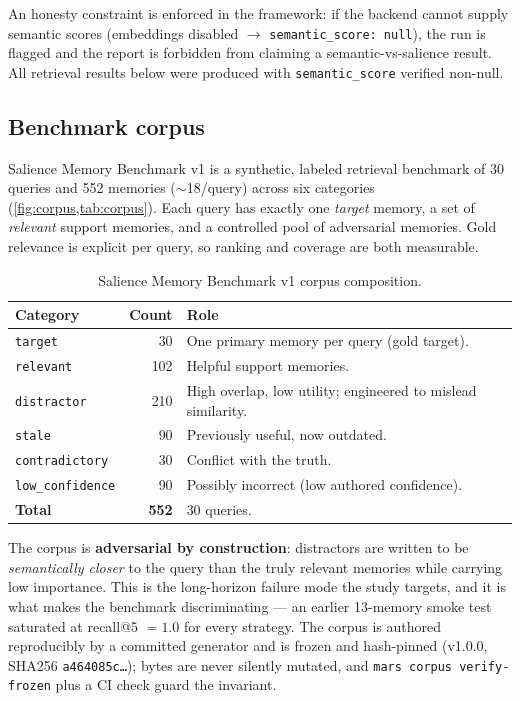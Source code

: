 \documentclass[11pt]{article}
\begin{document}
An honesty constraint is enforced in the framework: if the backend cannot supply semantic
scores (embeddings disabled $\to$ \texttt{semantic\_score: null}), the run is flagged and
the report is forbidden from claiming a semantic-vs-salience result. All retrieval results
below were produced with \texttt{semantic\_score} verified non-null.

\subsection{Benchmark corpus}
Salience Memory Benchmark v1 is a synthetic, labeled retrieval benchmark of 30 queries and
552 memories ($\sim$18/query) across six categories (\cref{fig:corpus,tab:corpus}). Each
query has exactly one \emph{target} memory, a set of \emph{relevant} support memories, and
a controlled pool of adversarial memories. Gold relevance is explicit per query, so ranking
and coverage are both measurable.

\begin{table}[h]
\centering
\caption{Salience Memory Benchmark v1 corpus composition.}
\label{tab:corpus}
\begin{tabular}{lrl}
\toprule
Category & Count & Role \\
\midrule
\texttt{target} & 30 & One primary memory per query (gold target). \\
\texttt{relevant} & 102 & Helpful support memories. \\
\texttt{distractor} & 210 & High overlap, low utility; engineered to mislead similarity. \\
\texttt{stale} & 90 & Previously useful, now outdated. \\
\texttt{contradictory} & 30 & Conflict with the truth. \\
\texttt{low\_confidence} & 90 & Possibly incorrect (low authored confidence). \\
\midrule
\textbf{Total} & \textbf{552} & 30 queries. \\
\bottomrule
\end{tabular}
\end{table}

The corpus is \textbf{adversarial by construction}: distractors are written to be
\emph{semantically closer} to the query than the truly relevant memories while carrying low
importance. This is the long-horizon failure mode the study targets, and it is what makes
the benchmark discriminating --- an earlier 13-memory smoke test saturated at recall@5
$=1.0$ for every strategy. The corpus is authored reproducibly by a committed generator and
is frozen and hash-pinned (v1.0.0, SHA256 \texttt{a464085c\ldots}); bytes are never
silently mutated, and \texttt{mars corpus verify-frozen} plus a CI check guard the
invariant.
\end{document}
